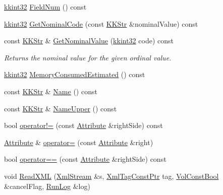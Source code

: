 \begin{DoxyCompactItemize}
\hyperlink{namespace_k_k_b_a8fa4952cc84fda1de4bec1fbdd8d5b1b}{kkint32} \hyperlink{class_k_k_m_l_l_1_1_attribute_a6ec2f162fc131b42eaa843f371f22b76}{Field\+Num} () const 
\item 
\hyperlink{namespace_k_k_b_a8fa4952cc84fda1de4bec1fbdd8d5b1b}{kkint32} \hyperlink{class_k_k_m_l_l_1_1_attribute_adc5bad6931d6c3f4aea6e1ad5c42b1f1}{Get\+Nominal\+Code} (const \hyperlink{class_k_k_b_1_1_k_k_str}{K\+K\+Str} \&nominal\+Value) const 
\item 
const \hyperlink{class_k_k_b_1_1_k_k_str}{K\+K\+Str} \& \hyperlink{class_k_k_m_l_l_1_1_attribute_ad9342fb254fb972f63825f8d5be25311}{Get\+Nominal\+Value} (\hyperlink{namespace_k_k_b_a8fa4952cc84fda1de4bec1fbdd8d5b1b}{kkint32} code) const 
\begin{DoxyCompactList}\small\item\em Returns the nominal value for the given ordinal value. \end{DoxyCompactList}\item 
\hyperlink{namespace_k_k_b_a8fa4952cc84fda1de4bec1fbdd8d5b1b}{kkint32} \hyperlink{class_k_k_m_l_l_1_1_attribute_a80f99020d7a1e70114fed4aa07c374bd}{Memory\+Consumed\+Estimated} () const 
\item 
const \hyperlink{class_k_k_b_1_1_k_k_str}{K\+K\+Str} \& \hyperlink{class_k_k_m_l_l_1_1_attribute_a3cd12e05138dfbda83c6802dc984e394}{Name} () const 
\item 
const \hyperlink{class_k_k_b_1_1_k_k_str}{K\+K\+Str} \& \hyperlink{class_k_k_m_l_l_1_1_attribute_a0026d6630458c1147f58d478e9e33a93}{Name\+Upper} () const 
\item 
bool \hyperlink{class_k_k_m_l_l_1_1_attribute_a6237d25c746776d26ad737a30a9c33f6}{operator!=} (const \hyperlink{class_k_k_m_l_l_1_1_attribute}{Attribute} \&right\+Side) const 
\item 
\hyperlink{class_k_k_m_l_l_1_1_attribute}{Attribute} \& \hyperlink{class_k_k_m_l_l_1_1_attribute_ac670d93bfd4b98b3e7952a51dbe3e722}{operator=} (const \hyperlink{class_k_k_m_l_l_1_1_attribute}{Attribute} \&right)
\item 
bool \hyperlink{class_k_k_m_l_l_1_1_attribute_abe2497616a670367e5299e174801d337}{operator==} (const \hyperlink{class_k_k_m_l_l_1_1_attribute}{Attribute} \&right\+Side) const 
\item 
void \hyperlink{class_k_k_m_l_l_1_1_attribute_a0da84adc664fea9c6b4ff35c4239af6e}{Read\+X\+ML} (\hyperlink{class_k_k_b_1_1_xml_stream}{Xml\+Stream} \&s, \hyperlink{namespace_k_k_b_a5f1b0b1667d79fec26deeff10c43df23}{Xml\+Tag\+Const\+Ptr} tag, \hyperlink{namespace_k_k_b_a7d390f568e2831fb76b86b56c87bf92f}{Vol\+Const\+Bool} \&cancel\+Flag, \hyperlink{class_k_k_b_1_1_run_log}{Run\+Log} \&log)

\end{DoxyCompactItemize}
